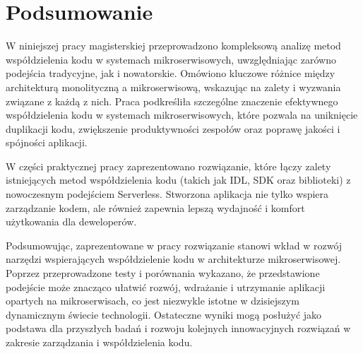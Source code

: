 \documentclass[runningheads,12pt]{llncs}
\begin{document}
\section{Podsumowanie}

W niniejszej pracy magisterskiej przeprowadzono kompleksową analizę metod współdzielenia kodu w systemach mikroserwisowych, uwzględniając zarówno podejścia tradycyjne, jak i nowatorskie. Omówiono kluczowe różnice między architekturą monolityczną a mikroserwisową, wskazując na zalety i wyzwania związane z każdą z nich. Praca podkreśliła szczególne znaczenie efektywnego współdzielenia kodu w systemach mikroserwisowych, które pozwala na uniknięcie duplikacji kodu, zwiększenie produktywności zespołów oraz poprawę jakości i spójności aplikacji.

W części praktycznej pracy zaprezentowano rozwiązanie, które łączy zalety istniejących metod współdzielenia kodu (takich jak IDL, SDK oraz biblioteki) z nowoczesnym podejściem Serverless. Stworzona aplikacja nie tylko wspiera zarządzanie kodem, ale również zapewnia lepszą wydajność i komfort użytkowania dla deweloperów.

Podsumowując, zaprezentowane w pracy rozwiązanie stanowi wkład w rozwój narzędzi wspierających współdzielenie kodu w architekturze mikroserwisowej. Poprzez przeprowadzone testy i porównania wykazano, że przedstawione podejście może znacząco ułatwić rozwój, wdrażanie i utrzymanie aplikacji opartych na mikroserwisach, co jest niezwykle istotne w dzisiejszym dynamicznym świecie technologii. Ostateczne wyniki mogą posłużyć jako podstawa dla przyszłych badań i rozwoju kolejnych innowacyjnych rozwiązań w zakresie zarządzania i współdzielenia kodu.

\nocite{*}

\listoftables

\listoffigures



\end{document}
